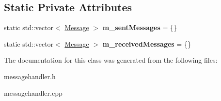 \subsection*{Static Private Attributes}
\begin{DoxyCompactItemize}
\item 
\hypertarget{class_message_handler_afab7e6704086a6098d5307ab62ee1035}{}static std\+::vector$<$ \hyperlink{struct_message}{Message} $>$ {\bfseries m\+\_\+sent\+Messages} = \{\}\label{class_message_handler_afab7e6704086a6098d5307ab62ee1035}

\item 
\hypertarget{class_message_handler_a32b68925a36229e748b8926b03c629c6}{}static std\+::vector$<$ \hyperlink{struct_message}{Message} $>$ {\bfseries m\+\_\+received\+Messages} = \{\}\label{class_message_handler_a32b68925a36229e748b8926b03c629c6}

\end{DoxyCompactItemize}


The documentation for this class was generated from the following files\+:\begin{DoxyCompactItemize}
\item 
messagehandler.\+h\item 
messagehandler.\+cpp\end{DoxyCompactItemize}
